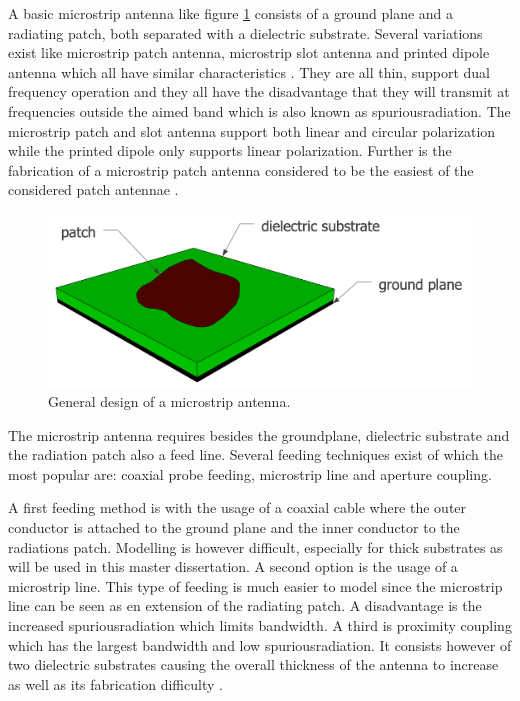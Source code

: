 A basic microstrip antenna like figure \ref{fig:basicpatchantenna} consists of a ground plane and
a radiating patch, both separated with a dielectric substrate. 
Several variations exist like microstrip patch antenna, microstrip slot antenna and printed dipole antenna which
all have similar characteristics \cite{J13_microstripadvantages, J14_antennadesign}. They are all thin, support dual frequency operation and they all have the disadvantage that they 
will transmit at frequencies outside the aimed band which is also known as
\gls{spuriousradiation}. The microstrip patch and slot antenna support both linear
and circular polarization while the printed dipole only supports linear polarization. Further is the fabrication of a microstrip patch antenna considered to be the easiest of the considered patch antennae \cite{J13_microstripadvantages}. 

\begin{figure}[H]
\centering
  \includegraphics[width=\textwidth/2]{../images/patchantenna.png}
  \caption{General design of a microstrip antenna.}
  \label{fig:basicpatchantenna}
\end{figure}

The microstrip antenna requires besides the groundplane, dielectric substrate and the radiation patch also a feed line. Several feeding techniques exist of which the most popular are: coaxial probe feeding, microstrip line and aperture coupling. %

A first feeding method is with the usage of a coaxial cable where the outer conductor is attached to the ground plane and the inner conductor to the radiations patch. Modelling is however difficult, especially for thick substrates as will be used in this master dissertation.
A second option is the usage of a microstrip line. This type of feeding is much easier to model since the microstrip line can be seen as en extension of the radiating patch.
A disadvantage is the increased \gls{spuriousradiation} which limits bandwidth.
A third is proximity coupling which has the largest bandwidth and low \gls{spuriousradiation}. It consists however of two dielectric substrates causing the overall thickness
of the antenna to increase as well as its fabrication difficulty \cite{J13_microstripadvantages}.

